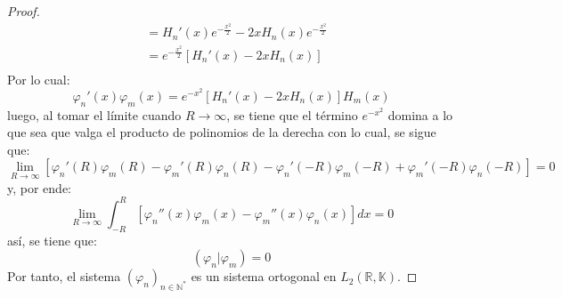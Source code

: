 \documentclass[12pt]{report}
\newcounter{it}
\theoremstyle{largebreak}
\newcommand\pint[2]{\ensuremath{\left(#1\big|#2\right)}}
\begin{document}
\begin{proof}
\begin{equation*}
\begin{split}
                &=H_n'(x)e^{-\frac{x^2}{2}}-2xH_n(x)e^{-\frac{x^2}{2}}\\
                &=e^{-\frac{x^2}{2}}\left[H_n'(x)-2xH_n(x)\right] \\
            \end{split}
        \end{equation*}
        Por lo cual:
        \begin{equation*}
            \varphi_n'(x)\varphi_m(x)=e^{-x^2}\left[H_n'(x)-2xH_n(x)\right]H_m(x)
        \end{equation*}
        luego, al tomar el límite cuando $R\rightarrow\infty$, se tiene que el término $e^{-x^2}$ domina a lo que sea que valga el producto de polinomios de la derecha con lo cual, se sigue que:
        \begin{equation*}
            \lim_{R\rightarrow\infty}\left[\varphi_n'(R)\varphi_m(R)-\varphi_m'(R)\varphi_n(R)-\varphi_n'(-R)\varphi_m(-R)+\varphi_m'(-R)\varphi_n(-R)\right]=0
        \end{equation*}
        y, por ende:
        \begin{equation*}
            \lim_{R\rightarrow\infty} \int_{-R}^R\left[\varphi_n''(x)\varphi_m(x)-\varphi_m''(x) \varphi_n(x)\right]dx=0
        \end{equation*}
        así, se tiene que:
        \begin{equation*}
            \pint{\varphi_n}{\varphi_m}=0
        \end{equation*}
        Por tanto, el sistema $\left(\varphi_n \right)_{ n\in\mathbb{N}^*}$ es un sistema ortogonal en $L_2(\mathbb{R},\mathbb{K})$.


\end{proof}
\end{document}
